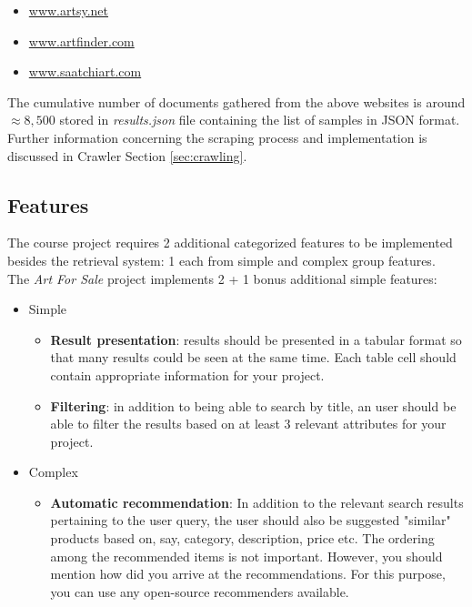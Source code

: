 \documentclass[12pt]{spieman}  %
\begin{document}
\begin{spacing}{1}
    \begin{itemize}
        \item \url{www.artsy.net}
        \item \url{www.artfinder.com}
        \item \url{www.saatchiart.com}
    \end{itemize}

    The cumulative number of documents gathered from the above websites is around $\approx 8,500$ stored in
    \textit{results.json} file containing the list of samples in JSON format.
    Further information concerning the scraping process and implementation is discussed
    in Crawler Section \ref{sec:crawling}.

    \subsection{Features}
    The course project requires 2 additional categorized features to be implemented besides
    the retrieval system:
    1 each from simple and complex group features.\\
    The \textit{Art For Sale} project implements 2 + 1 bonus additional simple features:

    \begin{itemize}
        \item Simple
              \begin{itemize}
                  \item \textbf{Result presentation}:
                        results should be presented in a tabular format so that many results could be
                        seen at the same time.
                        Each table cell should contain appropriate information for your project.
                  \item \textbf{Filtering}:
                        in addition to being able to search by title, an user should be able to filter the
                        results based on at least 3 relevant attributes for your project.
              \end{itemize}
        \item Complex
              \begin{itemize}
                  \item \textbf{Automatic recommendation}:
                        In addition to the relevant search results pertaining to the user query,
                        the user should also be suggested "similar" products based on, say,
                        category, description, price etc.
                        The ordering among the recommended items is not important.
                        However, you should mention how did you arrive at the recommendations.
                        For this purpose, you can use any open-source recommenders available.
              \end{itemize}
    \end{itemize}


\end{spacing}
\end{document}
